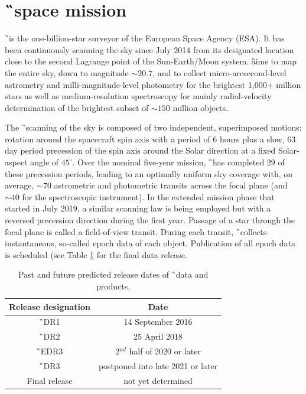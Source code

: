 \section{\G\ space mission}
\label{sec:gaia_data}
\G\ is the one-billion-star surveyor of the European Space Agency (ESA). It has been continuously scanning the sky since July 2014 from its designated location close to the second Lagrange point of the Sun-Earth/Moon system. \G aims to map the entire sky, down to magnitude $\sim20.7$, and to collect micro-arcsecond-level astrometry and milli-magnitude-level photometry for the brightest 1,000+ million stars as well as medium-resolution spectroscopy for mainly radial-velocity determination of the brightest subset of $\sim150$ million objects. 

The \G\ scanning of the sky is composed of two independent, superimposed motions: rotation around the spacecraft spin axis with a period of 6 hours plus a slow, 63 day period precession of the spin axis around the Solar direction at a fixed Solar-aspect angle of $45^\circ$. Over the nominal five-year mission, \G\ has completed $29$ of these precession periods, leading to an optimally uniform sky coverage with, on average, $\sim70$ astrometric and photometric transits across the focal plane (and $\sim40$ for the spectroscopic instrument). In the extended mission phase that started in July 2019, a similar scanning law is being employed but with a reversed precession direction during the first year. Passage of a star through the focal plane is called a field-of-view transit. During each transit, \G\ collects instantaneous, so-called epoch data of each object. Publication of all epoch data is scheduled (see Table \ref{tab:gaia_drs} for the final data release.

\begin{table}
	\centering
	\caption{Past and future predicted release dates of \G\ data and products.}
	\begin{tabular}{c c}
		\hline
		Release designation & Date \\ 
		\hline
		\G\ DR1 & 14 September 2016 \\
		\G\ DR2 & 25 April 2018 \\
		\G\ EDR3 & 2$^{nd}$ half of 2020 or later \\
		\G\ DR3 & postponed into late 2021 or later \\
		Final release & not yet determined \\
		\hline
	\end{tabular}
	\label{tab:gaia_drs}
\end{table}

